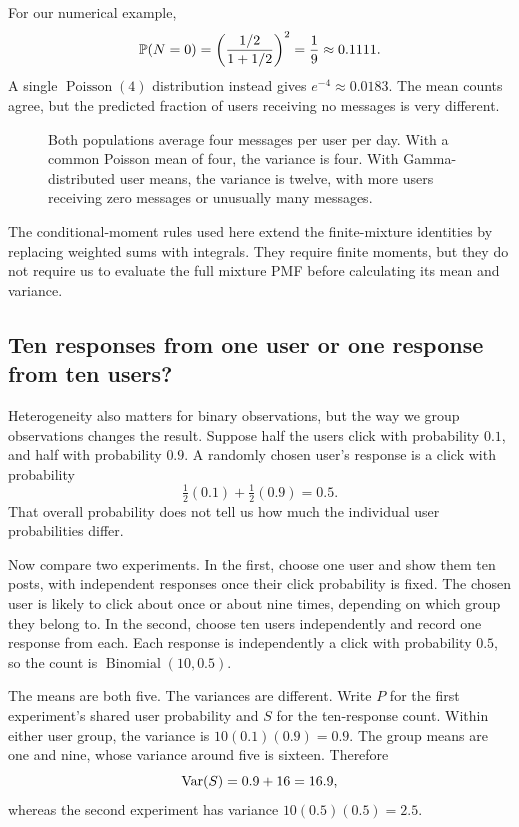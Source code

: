 For our numerical example,
\[
  \mathbb{P}(N=0)=\left(\frac{1/2}{1+1/2}\right)^2
            =\frac19\approx0.1111.
\]
A single \(\operatorname{Poisson}(4)\) distribution instead gives
\(e^{-4}\approx0.0183\). The mean counts agree, but the predicted fraction
of users receiving no messages is very different.

\begin{figure}[htbp]
  \centering
  
  \caption{Both populations average four messages per user per day.
  With a common Poisson mean of four, the variance is four.
  With Gamma-distributed user means, the variance is twelve, with more
  users receiving zero messages or unusually many messages.}
  \label{fig:heterogeneous-counts}
\end{figure}

The conditional-moment rules used here extend the finite-mixture
identities by replacing weighted sums with integrals. They require
finite moments, but they do not require us to evaluate the full mixture
PMF before calculating its mean and variance.

\subsection{Ten responses from one user or one response from ten users?}

Heterogeneity also matters for binary observations, but the way we group
observations changes the result. Suppose half the users click with
probability \(0.1\), and half with probability \(0.9\).
A randomly chosen user's response is a click with probability
\[
  \tfrac12(0.1)+\tfrac12(0.9)=0.5.
\]
That overall probability does not tell us how much the individual user
probabilities differ.

Now compare two experiments. In the first, choose one user and show
them ten posts, with independent responses once their click probability
is fixed. The chosen user is likely to click about once or about nine
times, depending on which group they belong to.
In the second, choose ten users independently and record one response
from each. Each response is independently a click with probability
\(0.5\), so the count is \(\operatorname{Binomial}(10,0.5)\).

The means are both five. The variances are different.
Write \(P\) for the first experiment's shared user probability and
\(S\) for the ten-response count. Within either user group, the variance
is \(10(0.1)(0.9)=0.9\). The group means are one and nine, whose variance
around five is sixteen. Therefore
\[
  \operatorname{Var}(S)=0.9+16=16.9,
\]
whereas the second experiment has variance \(10(0.5)(0.5)=2.5\).

